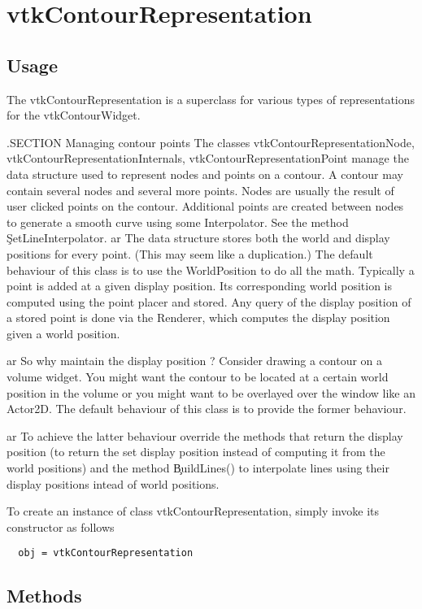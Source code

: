 \section{vtkContourRepresentation}

\subsection{Usage}

 The vtkContourRepresentation is a superclass for various types of
 representations for the vtkContourWidget.

 .SECTION Managing contour points
 The classes vtkContourRepresentationNode, vtkContourRepresentationInternals, 
 vtkContourRepresentationPoint manage the data structure used to represent 
 nodes and points on a contour. A contour may contain several nodes and 
 several more points. Nodes are usually the result of user clicked points on
 the contour. Additional points are created between nodes to generate a 
 smooth curve using some Interpolator. See the method \c SetLineInterpolator.
 ar
 The data structure stores both the world and display positions for every 
 point. (This may seem like a duplication.) The default behaviour of this 
 class is to use the WorldPosition to do all the math. Typically a point is
 added at a given display position. Its corresponding world position is 
 computed using the point placer and stored. Any query of the display 
 position of a stored point is done via the Renderer, which computes the 
 display position given a world position. 
 
 ar 
 So why maintain the display position ? Consider drawing a contour on a 
 volume widget. You might want the contour to be located at a certain world
 position in the volume or you might want to be overlayed over the window 
 like an Actor2D. The default behaviour of this class is to provide the 
 former behaviour. 

 ar
 To achieve the latter behaviour override the methods that return the display 
 position (to return the set display position instead of computing it from
 the world positions) and the method \c BuildLines() to interpolate lines 
 using their display positions intead of world positions.


To create an instance of class vtkContourRepresentation, simply
invoke its constructor as follows
\begin{verbatim}
  obj = vtkContourRepresentation
\end{verbatim}
\subsection{Methods}

